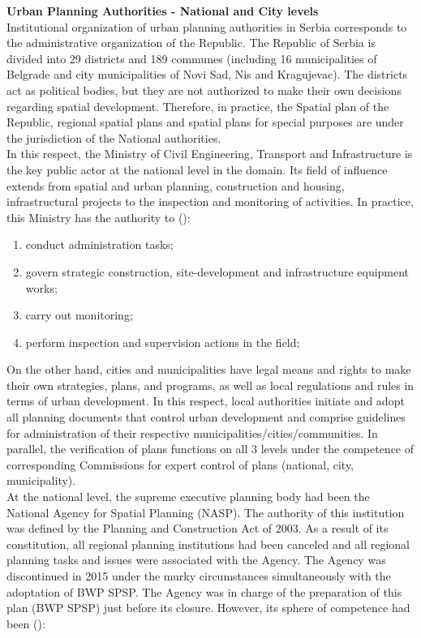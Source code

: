 \documentclass[11pt]{report}
\begin{document}
\textbf{Urban Planning Authorities - National and City levels}
\\
Institutional organization of urban planning authorities in Serbia corresponds to the administrative organization of the Republic.
The Republic of Serbia is divided into 29 districts and 189 communes (including 16 municipalities of Belgrade and city municipalities of Novi Sad, Nis and Kragujevac).
The districts act as political bodies, but they are not authorized to make their own decisions regarding spatial development.
Therefore, in practice, the Spatial plan of the Republic, regional spatial plans and spatial plans for special purposes are under the jurisdiction of the National authorities.
\\
In this respect, the Ministry of Civil Engineering, Transport and Infrastructure is the key public actor at the national level in the domain.
Its field of influence extends from spatial and urban planning, construction and housing, infrastructural projects to the inspection and monitoring of activities.
In practice, this Ministry has the authority to (\cite{(Maksic 2012)}):

\begin{enumerate}
\item conduct administration tasks;
\item govern strategic construction, site-development and infrastructure equipment works;
\item carry out monitoring;
\item perform inspection and supervision actions in the field;
\end{enumerate} 

On the other hand, cities and municipalities have legal means and rights to make their own strategies, plans, and programs, as well as local regulations and rules in terms of urban development.
In this respect, local authorities initiate and adopt all planning documents that control urban development and comprise guidelines for administration of their respective municipalities/cities/communities. In parallel, the verification of plans functions on all 3 levels under the competence of corresponding Commissions for expert control of plans (national, city, municipality).
\\
At the national level, the supreme executive planning body had been the National Agency for Spatial Planning (NASP). The authority of this institution was defined by the Planning and Construction Act of 2003.
As a result of its constitution, all regional planning institutions had been canceled and all regional planning tasks and issues were associated with the Agency. 
The Agency was discontinued in 2015 under the murky circumstances simultaneously with the adoptation of BWP SPSP. The Agency was in charge of the preparation of this plan (BWP SPSP) just before its closure.
However, its sphere of competence had been (\cite{Maksic 2012}):
\end{document}

